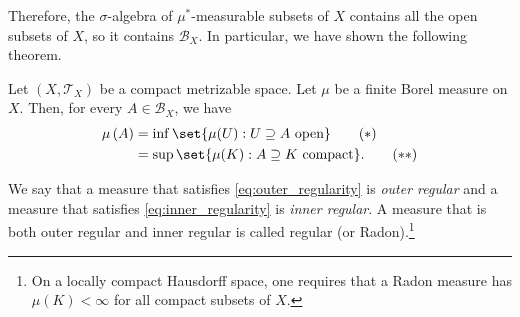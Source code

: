 \documentclass[10pt]{mypackage}
\begin{document}
Therefore, the $\sigma$-algebra of $\mu^{\ast}$-measurable subsets of $X$ contains all the open subsets of $X$, so it contains $\mathcal{B}_X$. In particular, we have shown the following theorem.
\begin{theorem}
  Let $\left( X,\mathcal{T}_X \right)$ be a compact metrizable space. Let $\mu$ be a finite Borel measure on $X$. Then, for every $A\in \mathcal{B}_X$, we have
  \begin{align*}
    \mu\left( A \right) &= \inf\set{\mu(U) : U\supseteq A\text{ open}}\label{eq:outer_regularity}\tag{$\ast$}\\
                        &= \sup\set{\mu(K) : A\supseteq K\text{ compact}}.\label{eq:inner_regularity}\tag{$\ast\ast$}
  \end{align*}
\end{theorem}
We say that a measure that satisfies \eqref{eq:outer_regularity} is \textit{outer regular} and a measure that satisfies \eqref{eq:inner_regularity} is \textit{inner regular}. A measure that is both outer regular and inner regular is called regular (or Radon).\footnote{On a locally compact Hausdorff space, one requires that a Radon measure has $\mu\left( K \right) < \infty$ for all compact subsets of $X$.}
\end{document}
